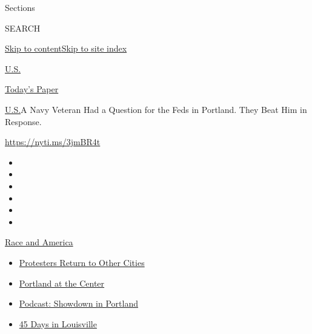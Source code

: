 Sections

SEARCH

\protect\hyperlink{site-content}{Skip to
content}\protect\hyperlink{site-index}{Skip to site index}

\href{https://www.nytimes.com/section/us}{U.S.}

\href{https://myaccount.nytimes.com/auth/login?response_type=cookie\&client_id=vi}{}

\href{https://www.nytimes.com/section/todayspaper}{Today's Paper}

\href{/section/us}{U.S.}\textbar{}A Navy Veteran Had a Question for the
Feds in Portland. They Beat Him in Response.

\url{https://nyti.ms/3jmBR4t}

\begin{itemize}
\item
\item
\item
\item
\item
\item
\end{itemize}

\href{https://www.nytimes.com/news-event/george-floyd-protests-minneapolis-new-york-los-angeles?action=click\&pgtype=Article\&state=default\&region=TOP_BANNER\&context=storylines_menu}{Race
and America}

\begin{itemize}
\tightlist
\item
  \href{https://www.nytimes.com/2020/07/26/us/protests-portland-seattle-trump.html?action=click\&pgtype=Article\&state=default\&region=TOP_BANNER\&context=storylines_menu}{Protesters
  Return to Other Cities}
\item
  \href{https://www.nytimes.com/2020/07/24/us/portland-oregon-protests-white-race.html?action=click\&pgtype=Article\&state=default\&region=TOP_BANNER\&context=storylines_menu}{Portland
  at the Center}
\item
  \href{https://www.nytimes.com/2020/07/23/podcasts/the-daily/portland-protests.html?action=click\&pgtype=Article\&state=default\&region=TOP_BANNER\&context=storylines_menu}{Podcast:
  Showdown in Portland}
\item
  \href{https://www.nytimes.com/interactive/2020/07/16/us/black-lives-matter-protests-louisville-breonna-taylor.html?action=click\&pgtype=Article\&state=default\&region=TOP_BANNER\&context=storylines_menu}{45
  Days in Louisville}
\end{itemize}

